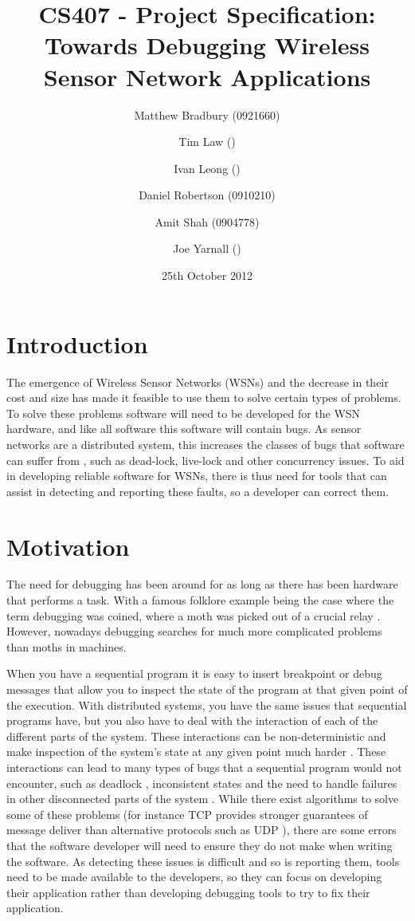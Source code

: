 \documentclass[a4paper]{article}
\title{CS407 - Project Specification:\\
Towards Debugging Wireless Sensor Network Applications}
\date{25th October 2012}
\author{
	Matthew Bradbury (0921660) \and
	Tim Law () \and
	Ivan Leong () \and
	Daniel Robertson (0910210) \and
	Amit Shah (0904778) \and
	Joe Yarnall ()
}
\begin{document}
\maketitle

\pagestyle{empty}
\thispagestyle{empty}

\newpage

\pagestyle{plain}
\setcounter{page}{1}

\tableofcontents
\clearpage


\section{Introduction}

The emergence of Wireless Sensor Networks (WSNs) and the decrease in their cost and size has made it feasible to use them to solve certain types of problems. To solve these problems software will need to be developed for the WSN hardware, and like all software this software will contain bugs. As sensor networks are a distributed system, this increases the classes of bugs that software can suffer from \cite{?}, such as dead-lock, live-lock and other concurrency issues. To aid in developing reliable software for WSNs, there is thus need for tools that can assist in detecting and reporting these faults, so a developer can correct them.

\section{Motivation}

The need for debugging has been around for as long as there has been hardware that performs a task. With a famous folklore example being the case where the term debugging was coined, where a moth was picked out of a crucial relay \cite{shapiro1987etymology}. However, nowadays debugging searches for much more complicated problems than moths in machines.

When you have a sequential program it is easy to insert breakpoint or debug messages that allow you to inspect the state of the program at that given point of the execution. With distributed systems, you have the same issues that sequential programs have, but you also have to deal with the interaction of each of the different parts of the system. These interactions can be non-deterministic \cite{liu2007wids} and make inspection of the system's state at any given point much harder \cite{?}. These interactions can lead to many types of bugs that a sequential program would not encounter, such as deadlock \cite{singhal1989deadlock}, inconsistent states \cite{?} and the need to handle failures in other disconnected parts of the system \cite{?}. While there exist algorithms to solve some of these problems (for instance TCP provides stronger guarantees of message deliver than alternative protocols such as UDP \cite[p.~532]{Tanenbaum:2002:CN:572404}), there are some errors that the software developer will need to ensure they do not make when writing the software. As detecting these issues is difficult and so is reporting them, tools need to be made available to the developers, so they can focus on developing their application rather than developing debugging tools to try to fix their application.
\end{document}
